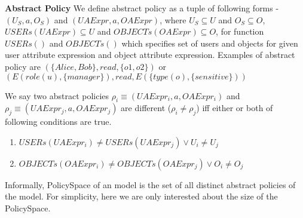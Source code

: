 \newcommand{\uSubset}{U_S}
\newcommand{\oSubset}{O_S}
\newcommand{\UAExpr}{UAExpr}
\newcommand{\OAExpr}{OAExpr}
\newcommand{\uSelector}{USERs}
\newcommand{\oSelector}{OBJECTs}
\newcommand{\policySpace}{PolicySpace}

 
 
 \textbf{Abstract Policy}
 We define abstract policy as a tuple of following forms - $(\uSubset, a, \oSubset)$ and $(\UAExpr, a, \OAExpr)$, where $\uSubset \subseteq U$ and $\oSubset \subseteq O$, $\uSelector(\UAExpr) \subseteq U$ and $\oSelector(\OAExpr) \subseteq O$, for function $\uSelector()$ and $\oSelector()$ which specifies set of users and objects for given user attribute expression and object attribute expression. Examples of abstract policy are $(\{ Alice, Bob\}, read, \{ o1, o2\} )$ or $( E(role(u), \{manager \}), read, E(\{ type(o), \{sensitive\} ) ) $
 
 We say two abstract policies $\rho_i \equiv (\UAExpr_i, a, \OAExpr_i)$ and   $\rho_j \equiv (\UAExpr_j, a, \OAExpr_j)$ are different ($\rho_i \neq \rho_j$) iff either or both of following conditions are true.
 \begin{enumerate}
 	\item $\uSelector(\UAExpr_i) \neq  \uSelector(\UAExpr_j) \lor U_i \neq U_j$  
 	\item $\oSelector(\OAExpr_i) \neq  \oSelector(\OAExpr_j) \lor O_i \neq O_j$
 \end{enumerate}

Informally, \policySpace{} of an model is the set of all distinct abstract policies of the model. For simplicity, here we are only interested about the size of the \policySpace{}.





